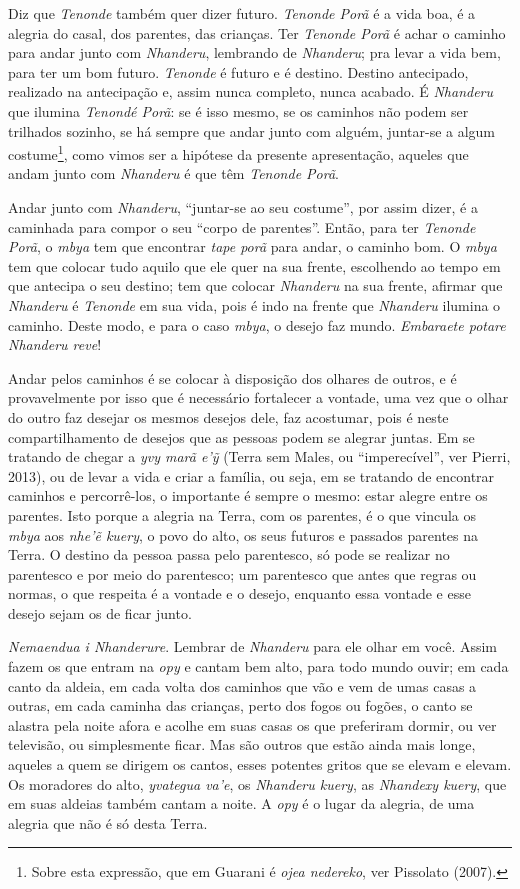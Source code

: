 Diz que \emph{Tenonde} também quer dizer futuro. \emph{Tenonde Porã} é a vida boa, é a
alegria do casal, dos parentes, das crianças. Ter \emph{Tenonde Porã} é achar
o caminho para andar junto com \emph{Nhanderu}, lembrando de \emph{Nhanderu}; pra
levar a vida bem, para ter um bom futuro. \emph{Tenonde} é futuro e é destino.
Destino antecipado, realizado na antecipação e, assim nunca completo,
nunca acabado. É \emph{Nhanderu} que ilumina \emph{Tenondé Porã}: se é isso mesmo, se
os caminhos não podem ser trilhados sozinho, se há sempre que andar
junto com alguém, juntar-se a algum costume\footnote{Sobre esta
expressão, que em Guarani é \emph{ojea nedereko}, ver Pissolato (2007).},
como vimos ser a hipótese da presente apresentação, aqueles que andam
junto com \emph{Nhanderu} é que têm \emph{Tenonde Porã}.

Andar junto com \emph{Nhanderu}, ``juntar-se ao seu costume'', por assim dizer, é
a caminhada para compor o seu ``corpo de parentes''. Então, para ter
\emph{Tenonde Porã}, o \emph{mbya} tem que encontrar \emph{tape porã} para andar, o caminho
bom. O \emph{mbya} tem que colocar tudo aquilo que ele quer na sua frente,
escolhendo ao tempo em que antecipa o seu destino; tem que colocar
\emph{Nhanderu} na sua frente, afirmar que \emph{Nhanderu} é \emph{Tenonde} em sua vida,
pois é indo na frente que \emph{Nhanderu} ilumina o caminho. Deste modo, e
para o caso \emph{mbya}, o desejo faz mundo. \emph{Embaraete potare Nhanderu reve}!

Andar pelos caminhos é se colocar à disposição dos olhares de outros, e
é provavelmente por isso que é necessário fortalecer a vontade, uma vez
que o olhar do outro faz desejar os mesmos desejos dele, faz acostumar,
pois é neste compartilhamento de desejos que as pessoas podem se
alegrar juntas. Em se tratando de chegar a \emph{yvy marã e’ỹ} (Terra sem
Males, ou ``imperecível'', ver Pierri, 2013), ou de levar a vida e criar
a família, ou seja, em se tratando de encontrar caminhos e
percorrê-los, o importante é sempre o mesmo: estar alegre entre os
parentes. Isto porque a alegria na Terra, com os parentes, é o que
vincula os \emph{mbya} aos \emph{nhe’ẽ kuery}, o povo do alto, os seus futuros
e passados parentes na Terra. O destino da pessoa passa pelo
parentesco, só pode se realizar no parentesco e por meio do parentesco;
um parentesco que antes que regras ou normas, o que respeita é a
vontade e o desejo, enquanto essa vontade e esse desejo sejam os de
ficar junto. 

\emph{Nemaendua i Nhanderure}. Lembrar de \emph{Nhanderu} para ele olhar em você.
Assim fazem os que entram na \emph{opy} e cantam bem alto, para todo mundo
ouvir; em cada canto da aldeia, em cada volta dos caminhos que vão e
vem de umas casas a outras, em cada caminha das crianças, perto dos
fogos ou fogões, o canto se alastra pela noite afora e acolhe em suas
casas os que preferiram dormir, ou ver televisão, ou simplesmente
ficar. Mas são outros que estão ainda mais longe, aqueles a quem se
dirigem os cantos, esses potentes gritos que se elevam e elevam. Os
moradores do alto, \emph{yvategua va’e}, os \emph{Nhanderu kuery}, as \emph{Nhandexy kuery},
que em suas aldeias também cantam a noite. A \emph{opy} é o lugar da alegria,
de uma alegria que não é só desta Terra. 


